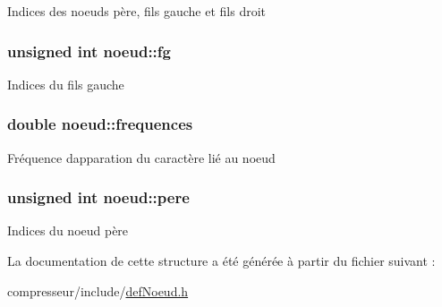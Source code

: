 Indices des noeuds père, fils gauche et fils droit 
\subsubsection[{\texorpdfstring{fg}{fg}}]{\setlength{\rightskip}{0pt plus 5cm}unsigned int noeud\+::fg}\hypertarget{structnoeud_ae14c26edcd37240fc9f8e3769d55d3e5}{}\label{structnoeud_ae14c26edcd37240fc9f8e3769d55d3e5}
Indices du fils gauche 
\subsubsection[{\texorpdfstring{frequences}{frequences}}]{\setlength{\rightskip}{0pt plus 5cm}double noeud\+::frequences}\hypertarget{structnoeud_a27b27306f715b45b8f8e47bb35ad3859}{}\label{structnoeud_a27b27306f715b45b8f8e47bb35ad3859}
Fréquence d\textquotesingle{}apparation du caractère lié au noeud 
\subsubsection[{\texorpdfstring{pere}{pere}}]{\setlength{\rightskip}{0pt plus 5cm}unsigned int noeud\+::pere}\hypertarget{structnoeud_aa5b03ff1fc332c2390f0324398c0ee1d}{}\label{structnoeud_aa5b03ff1fc332c2390f0324398c0ee1d}
Indices du noeud père 

La documentation de cette structure a été générée à partir du fichier suivant \+:\begin{DoxyCompactItemize}
\item 
compresseur/include/\hyperlink{compresseur_2include_2defNoeud_8h}{def\+Noeud.\+h}\end{DoxyCompactItemize}
